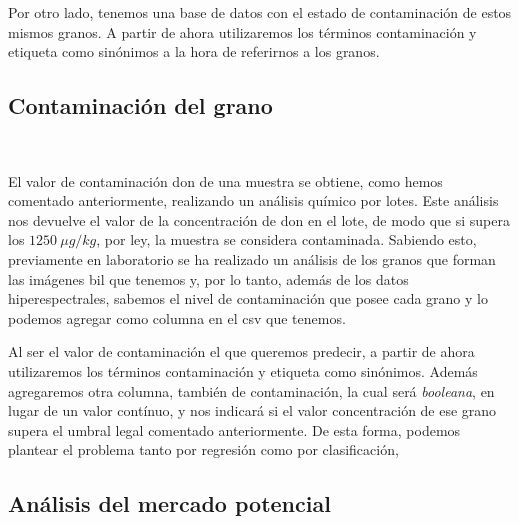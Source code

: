 Por otro lado, tenemos una base de datos con el estado de contaminación de estos mismos granos. A partir de ahora utilizaremos los términos contaminación y etiqueta como sinónimos a la hora de referirnos a los granos.


\subsection{Contaminación del grano}\ \label{sec:separacion}

El valor de contaminación \acrshort{don} de una muestra se obtiene, como hemos comentado anteriormente, realizando un análisis químico por lotes. Este análisis nos devuelve el valor de la concentración de \acrshort{don} en el lote, de modo que si supera los \(1250\ \mu g/kg\), por ley, la muestra se considera contaminada. Sabiendo esto, previamente en laboratorio se ha realizado un análisis de los granos que forman las imágenes \acrshort{bil} que tenemos y, por lo tanto, además de los datos hiperespectrales, sabemos el nivel de contaminación que posee cada grano y lo podemos agregar como columna en el \acrshort{csv} que tenemos.


Al ser el valor de contaminación el que queremos predecir, a partir de ahora utilizaremos los términos contaminación y etiqueta como sinónimos. Además agregaremos otra columna, también de contaminación, la cual será \textit{booleana}, en lugar de un valor contínuo, y nos indicará si el valor concentración de ese grano supera el umbral legal comentado anteriormente. De esta forma, podemos plantear el problema tanto por regresión como por clasificación, 


\subsection{Análisis del mercado potencial}






